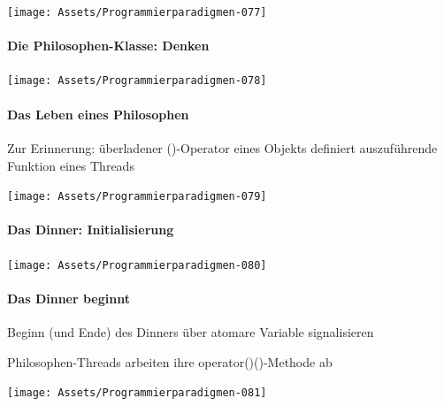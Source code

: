 \documentclass[10pt]{article}
\begin{document}
  \begin{center}
    \texttt{[image: Assets/Programmierparadigmen-077]}
  \end{center}
  
  \paragraph{Die Philosophen-Klasse: Denken}
  
  \begin{center}
    \texttt{[image: Assets/Programmierparadigmen-078]}
  \end{center}
  
  \paragraph{Das Leben eines Philosophen}
  
  \begin{itemize*}
    \item Zur Erinnerung: überladener ()-Operator eines Objekts definiert auszuführende Funktion eines Threads
  \end{itemize*}
  \begin{center}
    \texttt{[image: Assets/Programmierparadigmen-079]}
  \end{center}
  
  \paragraph{Das Dinner: Initialisierung}
  
  \begin{center}
    \texttt{[image: Assets/Programmierparadigmen-080]}
  \end{center}
  
  \paragraph{Das Dinner beginnt}
  
  \begin{itemize*}
    \item Beginn (und Ende) des Dinners über atomare Variable signalisieren
    \item Philosophen-Threads arbeiten ihre operator()()-Methode ab
  \end{itemize*}
  \begin{center}
    \texttt{[image: Assets/Programmierparadigmen-081]}
  \end{center}
  
\end{document}
